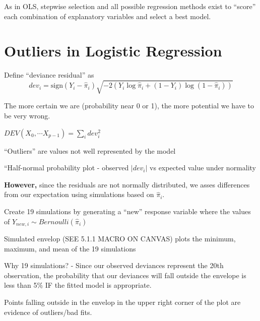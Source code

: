 \documentclass[12pt]{notes}
\begin{document}
\nspace
As in OLS, stepwise selection and all possible regression methods exist to ``score'' each combination of explanatory variables and select a best model. 



\section{Outliers in Logistic Regression}

\begin{minipage}[l][2cm][c]{\textwidth}
\end{minipage}

\bi
\item Define ``deviance residual'' as 
$$dev_i = \text{sign}(Y_i - \hat{\pi}_i)\sqrt{-2\left(Y_i\log\hat{\pi}_i + (1-Y_i)\log(1-\hat{\pi}_i)\right)}$$
\bi
\item The more certain we are (probability near 0 or 1), the more potential we have to be very wrong. 
\ei
\item $DEV(X_0, \cdots X_{p-1}) = \sum_i dev_i^2$
\item ``Outliers'' are values not well represented by the model
\item ``Half-normal probability plot - observed $|dev_i|$ vs expected value under normality
\bi
\item \textbf{However,} since the residuals are not normally distributed, we asses differences from our expectation using simulations based on $\hat{\pi}_i$. 
\bi
\item Create 19 simulations by generating a ``new'' response variable where the values of $Y_{new, i} \sim Bernoulli(\hat{\pi}_i)$
\ei
\item Simulated envelop (SEE 5.1.1 MACRO ON CANVAS) plots the minimum, maximum, and mean of the 19 simulations
\bi
\item Why 19 simulations? - Since our observed deviances represent the 20th observation, the probability that our deviances will fall outside the envelope is less than 5\% IF the fitted model is appropriate. 
\item Points falling outside in the envelop in the upper right corner of the plot are evidence of outliers/bad fits. 
\ei
\ei
\ei
\end{document}
